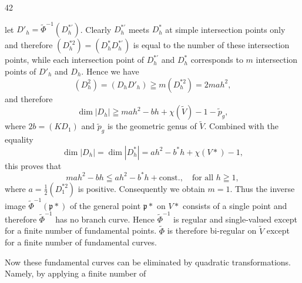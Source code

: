 \begin{center}42\end{center}
let $D'_h=\widetilde\Phi^{-1}(D_h^{*\prime})$. Clearly $D_h^{*\prime}$ meets $D_h^*$ at simple intersection points only and therefore $(D_h^{*2})=(D_h^*D_h^{*\prime})$ is equal to the number of these intersection points, while each intersection point of $D_h^{*\prime}$ and $D_h^*$ corresponds to $m$ intersection points of $D'_h$ and $D_h$. Hence we have
\[
(D_h^2)=(D_hD'_h)\geqq m(D_h^{*2})=2mah^2,
\]
and therefore
\[
\dim|D_h|\geqq mah^2-bh+\chi(\widetilde V)-1-\widetilde p_g,
\]
where $2b=(KD_1)$ and $\widetilde p_g$ is the geometric genus of $\widetilde V$. Combined with the equality
\[
\dim|D_h|=\dim|D_h^*|=ah^2-b^*h+\chi(V*)-1,
\]
this proves that
\[
mah^2-bh\leqq ah^2-b^*h+\text{const.},\quad\text{for all }h\geqq1,
\]
where $a=\frac12(D_1^{*2})$ is positive. Consequently we obtain $m=1$.
Thus the inverse image $\widetilde\Phi^{-1}(\mathfrak p*)$ of the general point $\mathfrak p*$ on $V*$ consists of a single point and therefore $\widetilde\Phi^{-1}$ has no branch curve. Hence $\widetilde\Phi^{-1}$ is regular and single-valued except for a finite number of fundamental points. $\widetilde\Phi$ is therefore bi-regular on $\widetilde V$ except for a finite number of fundamental curves.

Now these fundamental curves can be eliminated by quadratic transformations. Namely, by applying a finite number of

